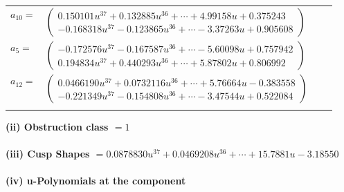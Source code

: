 \documentclass[1p]{elsarticle_modified}
\theoremstyle{definition}
\begin{document}
\begin{tabular}{m{7pt} m{180pt} m{7pt} m{180pt} }
\flushright $a_{10}=$&$\begin{pmatrix}0.150101 u^{37}+0.132885 u^{36}+\cdots+4.99158 u+0.375243\\-0.168318 u^{37}-0.123865 u^{36}+\cdots-3.37263 u+0.905608\end{pmatrix}$ \\
\flushright $a_{5}=$&$\begin{pmatrix}-0.172576 u^{37}-0.167587 u^{36}+\cdots-5.60098 u+0.757942\\0.194834 u^{37}+0.440293 u^{36}+\cdots+5.87802 u+0.806992\end{pmatrix}$ \\
\flushright $a_{12}=$&$\begin{pmatrix}0.0466190 u^{37}+0.0732116 u^{36}+\cdots+5.76664 u-0.383558\\-0.221349 u^{37}-0.154808 u^{36}+\cdots-3.47544 u+0.522084\end{pmatrix}$\\&\end{tabular}
\flushleft \textbf{(ii) Obstruction class $= 1$}\\~\\
\flushleft \textbf{(iii) Cusp Shapes $= 0.0878830 u^{37}+0.0469208 u^{36}+\cdots+15.7881 u-3.18550$}\\~\\
\newpage\renewcommand{\arraystretch}{1}
\flushleft \textbf{(iv) u-Polynomials at the component}\newline \\
\end{document}
